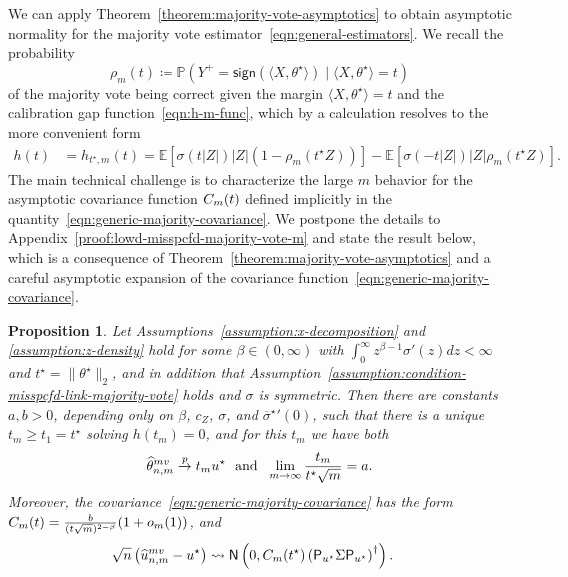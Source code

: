 \documentclass[11pt]{article}
\newcommand{\E}{\mathbb{E}}
\newcommand{\Prb}{\mathbb{P}}
\newcommand{\prn}[1]{\left({#1}\right)} %
\newcommand{\what}[1]{\widehat{#1}}
\newcommand{\wb}[1]{\overline{#1}}
\newcommand{\majY}{Y^+}
\newcommand{\sgn}{\mathsf{sign}}
\newcommand{\normal}{\mathsf{N}}
\newcommand{\mv}{^{\textup{mv}}}
\newcommand{\proj}{\mathsf{P}}
\newcommand{\norms}[1]{\|{#1}\|} %
\newcommand{\ltwos}[1]{\norms{#1}_2} %
\newcommand{\<}{\langle} %
\renewcommand{\>}{\rangle}
\newcommand{\cd}{\rightsquigarrow}
\newcommand{\cp}{\stackrel{p}{\rightarrow}}
\newcommand{\defeq}{\coloneqq}
\newcommand{\opt}{^\star}
\newtheorem{proposition}{Proposition}
\begin{document}
We can apply Theorem~\ref{theorem:majority-vote-asymptotics} to obtain
asymptotic normality for the majority vote
estimator~\eqref{eqn:general-estimators}. We recall the probability
\begin{equation}
  \label{eq:link-function-m-majority-vote-general}
  \rho_m(t) \defeq
  \Prb(\majY = \sgn(\<X, \theta^\star\>) \mid \<X,
  \theta\opt\> = t)
\end{equation}
of the majority vote being correct given the margin $\<X, \theta\opt\> = t$
and the calibration gap function~\eqref{eqn:h-m-func}, which by a
calculation resolves to the more convenient form
\begin{align*}
  h(t) & = h_{t\opt, m}(t) = \E[\sigma(t|Z|) |Z| (1 - \rho_m(t\opt Z))]
  - \E[\sigma(-t |Z|) |Z| \rho_m(t\opt Z)].
\end{align*}
The main technical challenge is to characterize the large $m$ behavior for
the asymptotic covariance function $C_m(t)$ defined implicitly in the
quantity~\eqref{eqn:generic-majority-covariance}.  We
postpone the details to Appendix~\ref{proof:lowd-misspcfd-majority-vote-m}
and state the result below, which is a consequence of
Theorem~\ref{theorem:majority-vote-asymptotics} and a careful asymptotic
expansion of the covariance
function~\eqref{eqn:generic-majority-covariance}.

\begin{proposition}
  \label{prop:lowd-misspcfd-majority-vote-m}
  Let Assumptions~\ref{assumption:x-decomposition} and
  \ref{assumption:z-density} hold for some $\beta \in (0, \infty)$ with
  $\int_0^\infty z^{\beta - 1} \sigma'(z) dz < \infty$
  and
  $t\opt = \ltwos{\theta\opt}$, and in addition that
  Assumption~\ref{assumption:condition-misspcfd-link-majority-vote} holds
  and $\sigma$ is symmetric.
  Then there are constants $a, b > 0$, depending only on $\beta$, $c_Z$,
  $\sigma$, and ${\wb{\sigma}\opt}'(0)$, such that there is a unique $t_m
  \geq t_1 = t^\star$ solving $h(t_m) = 0$, and for this $t_m$ we have both
  \begin{equation*}
    \what{\theta}\mv_{n,m} \cp t_m u\opt
    ~~ \mbox{and} ~~
    \lim_{m \to \infty} \frac{t_m}{t\opt \sqrt{m}} = a  .
  \end{equation*}
  Moreover, the covariance~\eqref{eqn:generic-majority-covariance} has the
  form $C_m(t) = \frac{b}{(t \sqrt m)^{2 - \beta}}(1 + o_m(1))$, and
  \begin{align*}
    \sqrt{n} \left(\what{u}\mv_{n,m} - u^\star \right)
    &\cd \normal\left(0, C_m(t\opt) \prn{\proj_{u\opt} \Sigma \proj_{u\opt}}^\dagger\right).
  \end{align*}
\end{proposition}
\end{document}
